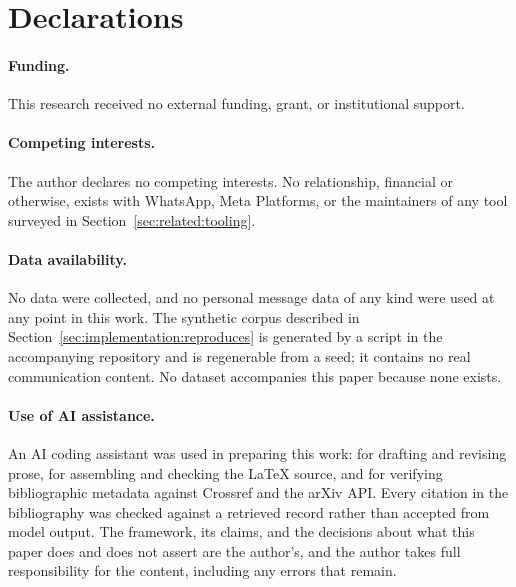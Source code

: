 \documentclass[11pt,a4paper]{article}
\begin{document}










\section*{Declarations}

\paragraph{Funding.}
This research received no external funding, grant, or institutional support.

\paragraph{Competing interests.}
The author declares no competing interests. No relationship, financial or
otherwise, exists with WhatsApp, Meta Platforms, or the maintainers of any tool
surveyed in Section~\ref{sec:related:tooling}.

\paragraph{Data availability.}
No data were collected, and no personal message data of any kind were used at any
point in this work. The synthetic corpus described in
Section~\ref{sec:implementation:reproduces} is generated by a script in the
accompanying repository and is regenerable from a seed; it contains no real
communication content. No dataset accompanies this paper because none exists.

\paragraph{Use of AI assistance.}
An AI coding assistant was used in preparing this work: for drafting and revising
prose, for assembling and checking the \LaTeX{} source, and for verifying
bibliographic metadata against Crossref and the arXiv API. Every citation in the
bibliography was checked against a retrieved record rather than accepted from
model output. The framework, its claims, and the decisions about what this paper
does and does not assert are the author's, and the author takes full
responsibility for the content, including any errors that remain.


\end{document}
